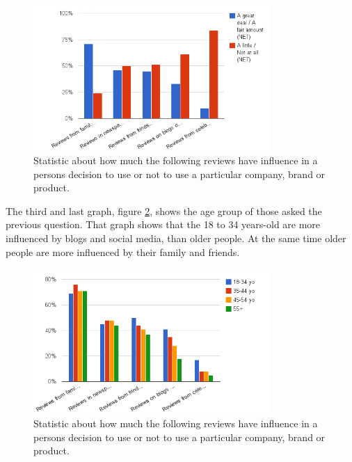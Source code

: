 \begin{figure}[H]
\centering
\includegraphics[width=0.8\textwidth]{Images/teori2.png}
\caption{Statistic about how much the following reviews have influence in a persons decision to use or not to use a particular company, brand or product.}
\label{Teori2}
\end{figure}

The third and last graph, figure \ref{Teori3}, shows the age group of those asked the previous question. That graph shows that the 18 to 34 years-old are more influenced by blogs and social media, than older people. At the same time older people are more influenced by their family and friends.

\begin{figure}[H]
\centering
\includegraphics[width=0.8\textwidth]{Images/teori3.png}
\caption{Statistic about how much the following reviews have influence in a persons decision to use or not to use a particular company, brand or product.}
\label{Teori3}
\end{figure}